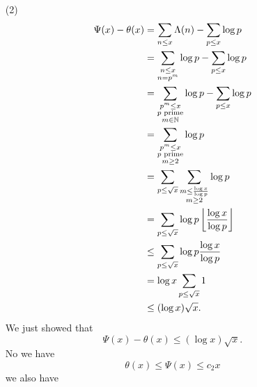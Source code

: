\documentclass[12pt]{article}
\begin{document}
{\begin{enumerate}
\begin{align*}
            \intertext{For large enough $x$ we have $\Psi(x_0)\leq \varepsilon x$}
            \Psi(x)&\leq(2+\varepsilon)x
            \intertext{For all $x\geq X_0$, and some $X_0>1$.}
        \end{align*}
        Combining everything, we get
        \[
            (2-\varepsilon)\leq\Psi(x)\leq(2+\varepsilon)x
        \]
        for all $x\geq X_0$.\\
        What if $2\leq x\leq X_0$? Trivially we have that 
        \[
            \frac{\Psi(x)}{x}\leq\frac{\Psi(X_0)}{2}.
        \]
        We also have that 
        \[
            \frac{\Psi(x)}{x}\geq\frac{\Psi(2)}{x}=\frac{\log2}{x}\leq\frac{\log2}{X_0}.
        \]
        This gives
        \[
            \frac{\log2}{X_0}x\leq\Psi(x)\leq\frac{\Psi(X_0)}{2}x
        \]
        for all $2\leq x\leq X_0$. All in all, $\exists c_1,c_2>0$ such that 
        \[
            c_1x\leq \Psi(x)\leq c_2x
        \]
        for all $x\geq2$.
        \item[(2)] 
        \begin{align*}
            \Psi(x)-\theta(x)&=\sum_{n\leq x}\Lambda(n)-\sum_{p\leq x}\log p\\
            &=\sum_{\substack{n\leq x\\ n=p^m}}\log p-\sum_{p\leq x}\log p\\    
            &=\sum_{\substack{p^m\leq x\\ p\text{ prime}\\m\in\mathbb{N}}}\log p-\sum_{p\leq x}\log p\\
            &=\sum_{\substack{p^m\leq x\\ p\text{ prime}\\m\geq2}}\log p\\
            &=\sum_{p\leq\sqrt{x}}\sum_{\substack{m\leq\frac{\log x}{\log p}\\m\geq2}}\log p\\    
            &=\sum_{p\leq\sqrt{x}}\log p\left\lfloor \frac{\log x}{\log p} \right\rfloor\\    
            &\leq\sum_{p\leq\sqrt{x}}\log p\frac{\log x}{\log p}\\
            &=\log x\sum_{p\leq\sqrt{x}}1\\
            &\leq(\log x)\sqrt{x}.
        \end{align*}
        We just showed that
        \[
            \Psi(x)-\theta(x)\leq (\log x)\sqrt{x}.
        \]
        No we have
        \[
            \theta(x)\leq \Psi(x)\leq c_2x
        \]
        we also have
        \begin{align*}

\end{align*}
\end{enumerate}}
\end{document}
